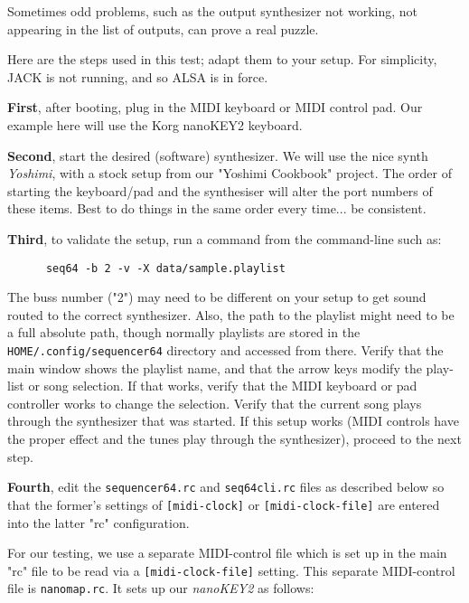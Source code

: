    Sometimes odd problems, such as the output synthesizer not working, not
   appearing in the list of outputs, can prove a real puzzle.
   
   Here are the steps used in this test; adapt them to your setup.  For
   simplicity, JACK is not running, and so ALSA is in force.

   \textbf{First}, after booting, plug in the MIDI keyboard or MIDI control
   pad.  Our example here will use the Korg nanoKEY2 keyboard.

   \textbf{Second}, start the desired (software) synthesizer.  We will use the
   nice synth \textsl{Yoshimi}, with a stock setup from our "Yoshimi Cookbook"
   project.  The order of starting the keyboard/pad and the synthesiser
   will alter the port numbers of these items.  Best to do things in the same
   order every time... be consistent.

   \textbf{Third}, to validate the setup, run a command from the command-line
   such as:

   \begin{verbatim}
      seq64 -b 2 -v -X data/sample.playlist
   \end{verbatim}

   The buss number ("2") may need to be different on your setup to get sound
   routed to the correct synthesizer.  Also, the path to the playlist might
   need to be a full absolute path, though normally playlists are stored in the
   \texttt{HOME/.config/sequencer64} directory and accessed from there.
   Verify that the main window shows the playlist name, and that the arrow keys
   modify the play-list or song selection.  If that works, verify that the MIDI
   keyboard or pad controller works to change the selection.
   Verify that the current song plays through the synthesizer that was started.
   If this setup works (MIDI controls have the proper effect and the tunes play
   through the synthesizer), proceed to the next step.

   \textbf{Fourth}, edit the \texttt{sequencer64.rc} and \texttt{seq64cli.rc}
   files as described below so that the former's settings of
   \texttt{[midi-clock]} or \texttt{[midi-clock-file]} are entered into the
   latter "rc" configuration.

   For our testing, we use a separate MIDI-control file which is set up
   in the main "rc" file to be read via a \texttt{[midi-clock-file]}
   setting.  This separate MIDI-control file is
   \texttt{nanomap.rc}.  It sets up our \textsl{nanoKEY2} as follows:


